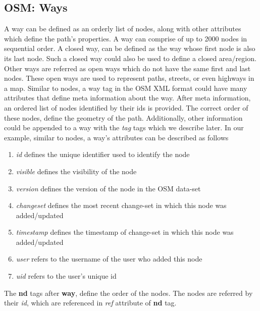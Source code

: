\subsection{OSM: Ways}
A way can be defined as an orderly list of nodes, along with other attributes which define the path's properties. A way can comprise of up to 2000 nodes in sequential order. A closed way, can be defined as the way whose first node is also its last node. Such a closed way could also be used to define a closed area/region. Other ways are referred as open ways which do not have the same first and last nodes. These open ways are used to represent paths, streets, or even highways in a map. Similar to nodes, a way tag in the OSM XML format could have many attributes that define meta information about the way. After meta information, an ordered list of nodes identified by their ids is provided. The correct order of these nodes, define the geometry of the path. Additionally, other information could be appended to a way with the \textit{tag} tags which we describe later. In our example, similar to nodes, a way's attributes can be described as follows
\begin{enumerate}
\item \textit{id} defines the unique identifier used to identify the node
\item \textit{visible} defines the visibility of the node
\item \textit{version} defines the version of the node in the OSM data-set
\item \textit{changeset} defines the most recent change-set in which this node was added/updated
\item \textit{timestamp} defines the timestamp of change-set in which this node was added/updated
\item \textit{user} refers to the username of the user who added this node
\item \textit{uid} refers to the user's unique id 
\end{enumerate}

The \textbf{nd} tags after \textbf{way}, define the order of the nodes. The nodes are referred by their \textit{id}, which are referenced in \textit{ref} attribute of \textbf{nd} tag.
